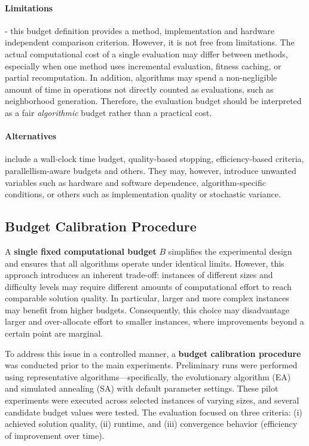 \documentclass[12pt,a4paper]{report}
\begin{document}
\paragraph{Limitations} - this budget definition provides a method, implementation and hardware independent comparison criterion. However, it is not free from limitations. The actual computational cost of a single evaluation may differ between methods, especially when one method uses incremental evaluation, fitness caching, or partial recomputation. In addition, algorithms may spend a non-negligible amount of time in operations not directly counted as evaluations, such as neighborhood generation. Therefore, the evaluation budget should be interpreted as a fair \emph{algorithmic} budget rather than a practical cost.

\paragraph{Alternatives} include a wall-clock time budget, quality-based stopping, efficiency-based criteria, parallellism-aware budgets and others. They may, however, introduce unwanted variables such as hardware and software dependence, algorithm-specific conditions, or others such as implementation quality or stochastic variance.

\subsection{Budget Calibration Procedure}

A \textbf{single fixed computational budget} \(B\) simplifies the experimental design and ensures that all algorithms operate under identical limits. However, this approach introduces an inherent trade-off: instances of different sizes and difficulty levels may require different amounts of computational effort to reach comparable solution quality. In particular, larger and more complex instances may benefit from higher budgets. Consequently, this choice may disadvantage larger and over-allocate effort to smaller instances, where improvements beyond a certain point are marginal.

To address this issue in a controlled manner, a \textbf{budget calibration procedure} was conducted prior to the main experiments. Preliminary runs were performed using representative algorithms—specifically, the evolutionary algorithm (EA) and simulated annealing (SA) with default parameter settings. These pilot experiments were executed across selected instances of varying sizes, and several candidate budget values were tested. The evaluation focused on three criteria: (i) achieved solution quality, (ii) runtime, and (iii) convergence behavior (efficiency of improvement over time).
\end{document}
